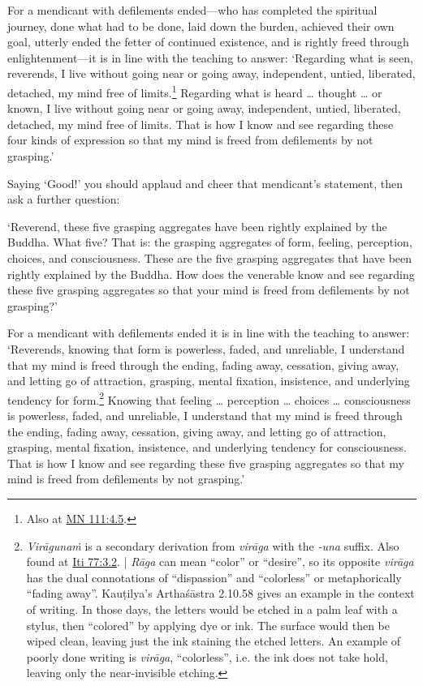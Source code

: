 \documentclass[12pt,openany]{book}%
\begin{document}
For a mendicant with defilements ended—who has completed the spiritual journey, done what had to be done, laid down the burden, achieved their own goal, utterly ended the fetter of continued existence, and is rightly freed through enlightenment—it is in line with the teaching to answer: ‘Regarding what is seen, reverends, I live without going near or going away, independent, untied, liberated, detached, my mind free of limits.\footnote{Also at \href{https://suttacentral.net/mn111/en/sujato\#4.5}{MN 111:4.5}. } Regarding what is heard … thought … or known, I live without going near or going away, independent, untied, liberated, detached, my mind free of limits. That is how I know and see regarding these four kinds of expression so that my mind is freed from defilements by not grasping.’ 

Saying ‘Good!’ you should applaud and cheer that mendicant’s statement, then ask a further question: 

‘Reverend, these five grasping aggregates have been rightly explained by the Buddha. What five? That is: the grasping aggregates of form, feeling, perception, choices, and consciousness. These are the five grasping aggregates that have been rightly explained by the Buddha. How does the venerable know and see regarding these five grasping aggregates so that your mind is freed from defilements by not grasping?’ 

For a mendicant with defilements ended it is in line with the teaching to answer: ‘Reverends, knowing that form is powerless, faded, and unreliable, I understand that my mind is freed through the ending, fading away, cessation, giving away, and letting go of attraction, grasping, mental fixation, insistence, and underlying tendency for form.\footnote{\textit{\textsanskrit{Virāgunaṁ}} is a secondary derivation from \textit{\textsanskrit{virāga}} with the \textit{-una} suffix. Also found at \href{https://suttacentral.net/iti77/en/sujato\#3.2}{Iti 77:3.2}. | \textit{\textsanskrit{Rāga}} can mean “color” or “desire”, so its opposite \textit{\textsanskrit{virāga}} has the dual connotations of “dispassion” and “colorless” or metaphorically “fading away”. \textsanskrit{Kauṭilya}’s \textsanskrit{Arthaśāstra} 2.10.58 gives an example in the context of writing. In those days, the letters would be etched in a palm leaf with a stylus, then “colored” by applying dye or ink. The surface would then be wiped clean, leaving just the ink staining the etched letters. An example of poorly done writing is \textit{\textsanskrit{virāga}}, “colorless”, i.e. the ink does not take hold, leaving only the near-invisible etching. } Knowing that feeling … perception … choices … consciousness is powerless, faded, and unreliable, I understand that my mind is freed through the ending, fading away, cessation, giving away, and letting go of attraction, grasping, mental fixation, insistence, and underlying tendency for consciousness. That is how I know and see regarding these five grasping aggregates so that my mind is freed from defilements by not grasping.’ 
\end{document}
